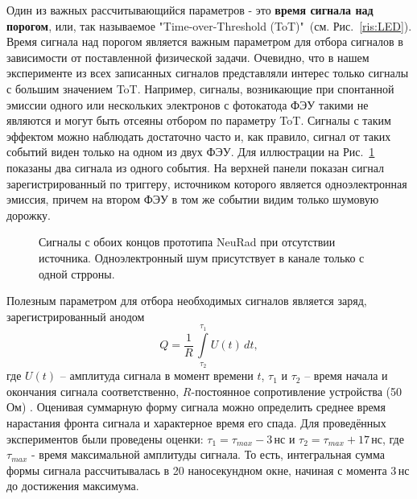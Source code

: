 Один из важных рассчитывающийся параметров - это \textbf{время сигнала над порогом}, или, так называемое "Time-over-Threshold (ToT)"\ (см. Рис.~\ref{ris:LED}). Время сигнала над порогом является важным параметром для отбора сигналов в зависимости от поставленной физической задачи.
Очевидно, что в нашем эксперименте из всех записанных сигналов представляли интерес только сигналы с большим значением ToT. Например, сигналы, возникающие при спонтанной эмиссии одного или нескольких электронов с фотокатода ФЭУ такими не являются и могут быть отсеяны отбором по параметру ToT. Сигналы с таким эффектом можно наблюдать достаточно часто и, как правило, сигнал от таких событий виден только на одном из двух ФЭУ.
Для иллюстрации на Рис.~\ref{ris:noise} показаны два сигнала из одного события. На верхней панели показан сигнал зарегистрированный по триггеру, источником которого является одноэлектронная эмиссия, причем на втором ФЭУ в том же событии видим только шумовую дорожку.

\begin{figure}[!h]
	\caption{Сигналы с обоих концов прототипа NeuRad при отсутствии источника. Одноэлектронный шум присутствует в канале только с одной стрроны.}
	\label{ris:noise}
\end{figure}

Полезным параметром для отбора необходимых сигналов является заряд, зарегистрированный анодом
\begin{equation}
Q = \frac{1}{R}\, \int\limits^{\tau_1}_{\tau_2} U(t)\, dt,
\label{charge}
\end{equation}
где $U(t)$ -- амплитуда сигнала в момент времени $t$, $\tau_1$ и $\tau_2$ -- время начала и окончания сигнала соответственно, $R$-постоянное сопротивление устройства (50\,Ом) \cite{vratislav}. Оценивая суммарную форму сигнала можно определить среднее время нарастания фронта сигнала и характерное время его спада. 
Для проведённых экспериментов были проведены оценки: $\tau_1 = \tau_{max} - 3\,$нс и $\tau_2 = \tau_{max} + 17\,$нс, где $\tau_{max}$ - время максимальной амплитуды сигнала. То есть, интегральная сумма формы сигнала рассчитывалась в 20 наносекундном окне, начиная с момента 3\,нс до достижения максимума.

